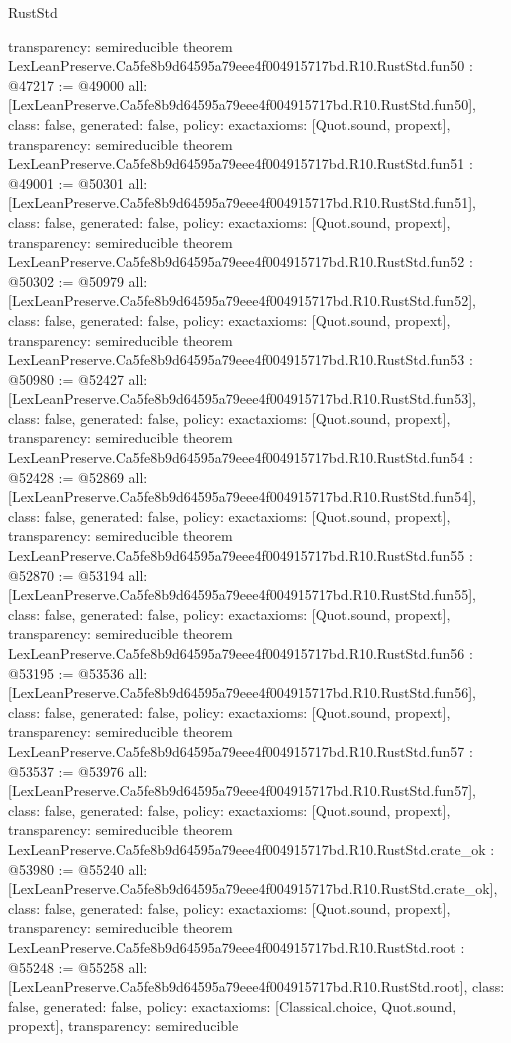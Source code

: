 \begin{lexlean}{RustStd}
\begin{coremodule}
{  transparency: semireducible
}
theorem LexLeanPreserve.Ca5fe8b9d64595a79eee4f004915717bd.R10.RustStd.fun50 : @47217 := @49000 {
  all: [LexLeanPreserve.Ca5fe8b9d64595a79eee4f004915717bd.R10.RustStd.fun50],
  class: false,
  generated: false,
  policy: exact{axioms: [Quot.sound, propext]},
  transparency: semireducible
}
theorem LexLeanPreserve.Ca5fe8b9d64595a79eee4f004915717bd.R10.RustStd.fun51 : @49001 := @50301 {
  all: [LexLeanPreserve.Ca5fe8b9d64595a79eee4f004915717bd.R10.RustStd.fun51],
  class: false,
  generated: false,
  policy: exact{axioms: [Quot.sound, propext]},
  transparency: semireducible
}
theorem LexLeanPreserve.Ca5fe8b9d64595a79eee4f004915717bd.R10.RustStd.fun52 : @50302 := @50979 {
  all: [LexLeanPreserve.Ca5fe8b9d64595a79eee4f004915717bd.R10.RustStd.fun52],
  class: false,
  generated: false,
  policy: exact{axioms: [Quot.sound, propext]},
  transparency: semireducible
}
theorem LexLeanPreserve.Ca5fe8b9d64595a79eee4f004915717bd.R10.RustStd.fun53 : @50980 := @52427 {
  all: [LexLeanPreserve.Ca5fe8b9d64595a79eee4f004915717bd.R10.RustStd.fun53],
  class: false,
  generated: false,
  policy: exact{axioms: [Quot.sound, propext]},
  transparency: semireducible
}
theorem LexLeanPreserve.Ca5fe8b9d64595a79eee4f004915717bd.R10.RustStd.fun54 : @52428 := @52869 {
  all: [LexLeanPreserve.Ca5fe8b9d64595a79eee4f004915717bd.R10.RustStd.fun54],
  class: false,
  generated: false,
  policy: exact{axioms: [Quot.sound, propext]},
  transparency: semireducible
}
theorem LexLeanPreserve.Ca5fe8b9d64595a79eee4f004915717bd.R10.RustStd.fun55 : @52870 := @53194 {
  all: [LexLeanPreserve.Ca5fe8b9d64595a79eee4f004915717bd.R10.RustStd.fun55],
  class: false,
  generated: false,
  policy: exact{axioms: [Quot.sound, propext]},
  transparency: semireducible
}
theorem LexLeanPreserve.Ca5fe8b9d64595a79eee4f004915717bd.R10.RustStd.fun56 : @53195 := @53536 {
  all: [LexLeanPreserve.Ca5fe8b9d64595a79eee4f004915717bd.R10.RustStd.fun56],
  class: false,
  generated: false,
  policy: exact{axioms: [Quot.sound, propext]},
  transparency: semireducible
}
theorem LexLeanPreserve.Ca5fe8b9d64595a79eee4f004915717bd.R10.RustStd.fun57 : @53537 := @53976 {
  all: [LexLeanPreserve.Ca5fe8b9d64595a79eee4f004915717bd.R10.RustStd.fun57],
  class: false,
  generated: false,
  policy: exact{axioms: [Quot.sound, propext]},
  transparency: semireducible
}
theorem LexLeanPreserve.Ca5fe8b9d64595a79eee4f004915717bd.R10.RustStd.crate_ok : @53980 := @55240 {
  all: [LexLeanPreserve.Ca5fe8b9d64595a79eee4f004915717bd.R10.RustStd.crate_ok],
  class: false,
  generated: false,
  policy: exact{axioms: [Quot.sound, propext]},
  transparency: semireducible
}
theorem LexLeanPreserve.Ca5fe8b9d64595a79eee4f004915717bd.R10.RustStd.root : @55248 := @55258 {
  all: [LexLeanPreserve.Ca5fe8b9d64595a79eee4f004915717bd.R10.RustStd.root],
  class: false,
  generated: false,
  policy: exact{axioms: [Classical.choice, Quot.sound, propext]},
  transparency: semireducible
}


\end{coremodule}
\end{lexlean}
